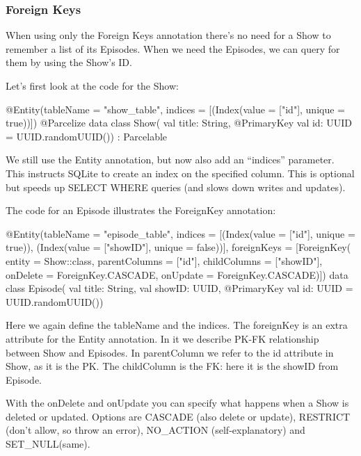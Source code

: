 \subsubsection{Foreign Keys}
When using only the Foreign Keys annotation there's no need for a Show to remember a list of its Episodes.
When we need the Episodes, we can query for them by using the Show's ID.

Let's first look at the code for the Show:
\begin{android}
@Entity(tableName = "show_table", indices = [(Index(value = ["id"], unique = true))])
@Parcelize
data class Show(
	val title: String,
	@PrimaryKey
	val id: UUID = UUID.randomUUID()) : Parcelable
\end{android}
We still use the Entity annotation, but now also add an ``indices'' parameter. 
This instructs SQLite to create an index on the specified column.
This is optional but speeds up SELECT WHERE queries (and slows down writes and updates).

The code for an Episode illustrates the ForeignKey annotation:
\begin{android}	
@Entity(tableName = "episode_table",
		indices = [(Index(value = ["id"], unique = true)), (Index(value = ["showID"], unique = false))],
		foreignKeys = [ForeignKey(
			entity = Show::class,
			parentColumns = ["id"],
			childColumns = ["showID"],
			onDelete = ForeignKey.CASCADE,
			onUpdate = ForeignKey.CASCADE)])
data class Episode(
	val title: String,
	val showID: UUID,
	@PrimaryKey
	val id: UUID = UUID.randomUUID())
\end{android}
Here we again define the tableName and the indices.
The foreignKey is an extra attribute for the Entity annotation.
In it we describe PK-FK relationship between Show and Episodes.
In parentColumn we refer to the id attribute in Show, as it is the PK. 
The childColumn is the FK: here it is the showID from Episode. 

With the onDelete and onUpdate you can specify what happens when a Show is deleted or updated.
Options are CASCADE (also delete or update), RESTRICT (don't allow, so throw an error), NO\_ACTION (self-explanatory) and SET\_NULL(same).
